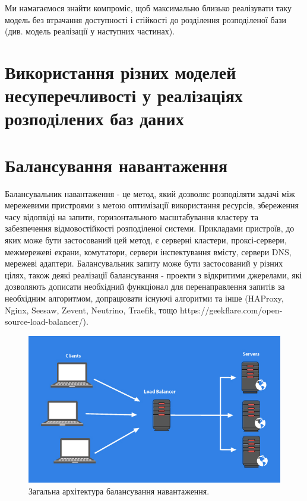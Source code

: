 \documentclass[14pt]{vakthesis}
\begin{document}
Ми намагаємося знайти компроміс, щоб максимально близько реалізувати таку модель без втрачання доступності і стійкості до розділення розподіленої бази (див. модель реалізації  у наступних частинах).

\section{Використання різних моделей несуперечливості у реалізаціях розподілених баз даних}
\section{Балансування навантаження}

Балансувальник навантаження - це метод, який дозволяє розподіляти задачі між мережевими пристроями з метою оптимізації використання ресурсів, збереження часу відопвіді на запити, горизонтального масштабування кластеру та забезпечення відмовостійкості розподіленої системи. Прикладами пристроїв, до яких може бути застосований цей метод, є серверні кластери, проксі-сервери, межмережеві екрани, комутатори, сервери інспектування вмісту, сервери DNS, мережеві адаптери. Балансувальник запиту може бути застосований у різних цілях, також деякі реалізації балансування - проекти з відкритими джерелами, які дозволяють дописати необхідний функціонал для перенаправлення запитів за необхідним алгоритмом, допрацювати існуючі алгоритми та інше (HAProxy, Nginx, Seesaw, Zevent, Neutrino, Traefik, тощо https://geekflare.com/open-source-load-balancer/).
\begin{figure}
\centering
\includegraphics[width=\linewidth]{images/load-balancing-general.jpg}
     \caption{Загальна архітектура балансування навантаження.}
     \label{fig:lb_general}
\end{figure}
\end{document}
